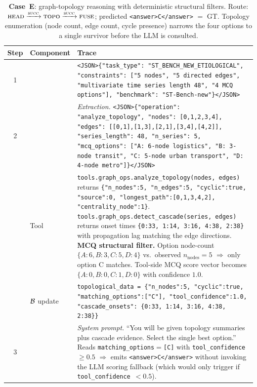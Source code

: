 \begin{table}[H]
\centering
\caption{\textbf{Case~E}: graph-topology reasoning with deterministic structural filters.  Route: $\textnormal{\textsc{head}} \xrightarrow{\textnormal{\textsc{succ}}} \textnormal{\textsc{topo}} \xrightarrow{\textnormal{\textsc{succ}}} \textnormal{\textsc{fuse}}$; predicted \texttt{<answer>C</answer>} $=$ GT.  Topology enumeration (node count, edge count, cycle presence) narrows the four options to a single survivor before the LLM is consulted.}
\label{tab:case_e}
\small
\begin{tabular}{c l p{10.5cm}}
\toprule
Step & Component & Trace \\
\midrule
1 & \shead{} &
\texttt{<JSON>\{"task\_type": "ST\_BENCH\_NEW\_ETIOLOGICAL", "constraints": ["5 nodes", "5 directed edges", "multivariate time series length 48", "4 MCQ options"], "benchmark": "ST-Bench-new"\}</JSON>} \\
\midrule
2 & \stopo{} &
\textit{Extraction.}  \texttt{<JSON>\{"operation": "analyze\_topology", "nodes": [0,1,2,3,4], "edges": [[0,1],[1,3],[2,1],[3,4],[4,2]], "series\_length": 48, "n\_series": 5, "mcq\_options": ["A: 6-node logistics", "B: 3-node transit", "C: 5-node urban transport", "D: 4-node metro"]\}</JSON>} \\
\midrule
  & Tool &
\texttt{tools.graph\_ops.analyze\_topology(nodes, edges)} returns \texttt{\{"n\_nodes":5, "n\_edges":5, "cyclic":true, "source":0, "longest\_path":[0,1,3,4,2], "centrality\_node":1\}}. \newline
\texttt{tools.graph\_ops.detect\_cascade(series, edges)} returns onset times \texttt{\{0:33, 1:14, 3:16, 4:38, 2:38\}} with propagation lag matching the edge directions. \newline
\textbf{MCQ structural filter.}  Option node-count $\{A:6, B:3, C:5, D:4\}$ vs.\ observed $n_{\text{nodes}}=5$ $\Rightarrow$ only option C matches.  Tool-side MCQ score vector becomes $\{A:0, B:0, C:1, D:0\}$ with confidence $1.0$. \\
\midrule
  & $\mathcal{B}$ update &
\texttt{topological\_data = \{"n\_nodes":5, "cyclic":true, "matching\_options":["C"], "tool\_confidence":1.0, "cascade\_onsets": \{0:33, 1:14, 3:16, 4:38, 2:38\}\}} \\
\midrule
3 & \sfuse{} &
\textit{System prompt.}  ``You will be given topology summaries plus cascade evidence.  Select the single best option.'' \newline
Reads \texttt{matching\_options}$=$\texttt{[C]} with \texttt{tool\_confidence} $\geq 0.5$ $\Rightarrow$ emits \texttt{<answer>C</answer>} without invoking the LLM scoring fallback (which would only trigger if \texttt{tool\_confidence $< 0.5$}). \\
\bottomrule
\end{tabular}
\end{table}
\FloatBarrier

\clearpage
